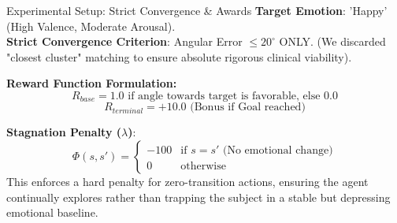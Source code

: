 \documentclass[10pt, aspectratio=169]{beamer}
\begin{document}
\begin{frame}{Experimental Setup: Strict Convergence \& Awards}
    \textbf{Target Emotion}: 'Happy' (High Valence, Moderate Arousal). \\
    \textbf{Strict Convergence Criterion}: Angular Error $\leq 20^\circ$ ONLY. (We discarded "closest cluster" matching to ensure absolute rigorous clinical viability).
    
    \vspace{0.4cm}
    \textbf{Reward Function Formulation:}
    \begin{equation*}
        R_{base} = 1.0 \text{ if angle towards target is favorable, else } 0.0
    \end{equation*}
    \begin{equation*}
        R_{terminal} = +10.0 \text{ (Bonus if Goal reached)}
    \end{equation*}
    
    \vspace{0.2cm}
    \textbf{Stagnation Penalty ($\lambda$)}:
    \begin{equation*}
        \Phi(s, s') = 
        \begin{cases} 
        -100 & \text{if } s = s' \text{ (No emotional change)} \\
        0 & \text{otherwise}
        \end{cases}
    \end{equation*}
    This enforces a hard penalty for zero-transition actions, ensuring the agent continually explores rather than trapping the subject in a stable but depressing emotional baseline.
\end{frame}

\end{document}
